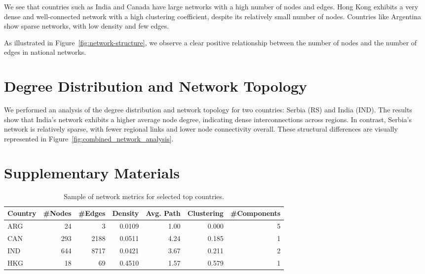 We see that countries such as India and Canada have large networks with a high number of nodes and edges. Hong Kong exhibits a very dense and well-connected network with a high clustering coefficient, despite its relatively small number of nodes. Countries like Argentina show sparse networks, with low density and few edges.


As illustrated in Figure~\ref{fig:network-structure}, we observe a clear positive relationship between the number of nodes and the number of edges in national networks.

\section{Degree Distribution and Network Topology}

We performed an analysis of the degree distribution and network topology for two countries: Serbia (RS) and India (IND). The results show that India's network exhibits a higher average node degree, indicating dense interconnections across regions. In contrast, Serbia's network is relatively sparse, with fewer regional links and lower node connectivity overall. These structural differences are visually represented in Figure~\ref{fig:combined_network_analysis}.







\newpage
\section*{Supplementary Materials}

\begin{table}[H]
\centering
\footnotesize
\begin{tabular}{lrrrrrr}
\toprule
\textbf{Country} & \textbf{\#Nodes} & \textbf{\#Edges} & \textbf{Density} & \textbf{Avg. Path} & \textbf{Clustering} & \textbf{\#Components} \\
\midrule

ARG & 24 & 3 & 0.0109 & 1.00 & 0.000 & 5 \\
CAN & 293 & 2188 & 0.0511 & 4.24 & 0.185 & 1 \\
IND & 644 & 8717 & 0.0421 & 3.67 & 0.211 & 2 \\
HKG & 18 & 69 & 0.4510 & 1.57 & 0.579 & 1 \\
\bottomrule
\end{tabular}
\caption{Sample of network metrics for selected top countries.}
\label{tab:network_metrics}
\end{table}


